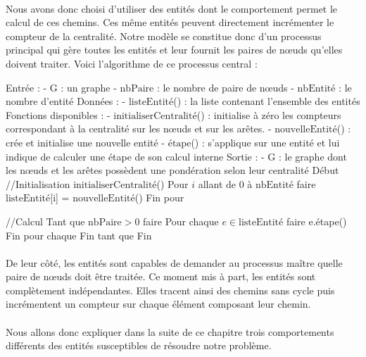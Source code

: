 \documentclass[a4paper, 10pt]{report}
\begin{document}
\paragraph{}Nous avons donc choisi d'utiliser des entités dont le comportement permet le calcul de ces chemins. Ces même entités peuvent directement incrémenter le compteur de la centralité. Notre modèle se constitue donc d'un processus principal qui gère toutes les entités et leur fournit les paires de n\oe uds qu'elles doivent traiter. Voici l'algorithme de ce processus central :

\begin{algo}
Entrée : 
	- $\text{G}$ : un graphe
	- $\text{nbPaire}$ : le nombre de paire de nœuds
	- $\text{nbEntit\'e}$ : le nombre d'entité
Données :
	- $\text{listeEntit\'e}$() : la liste contenant l'ensemble des entités
Fonctions disponibles :
	- $\text{initialiserCentralit\'e}$() : initialise à zéro les compteurs correspondant à la centralité sur les nœuds
	  et sur les arêtes.
	- $\text{nouvelleEntit\'e}$() : crée et initialise une nouvelle entité
	- $\text{\'etape}$() : s'applique sur une entité et lui indique de calculer une étape de son calcul interne
Sortie : 
	- $\text{G}$ : le graphe dont les nœuds et les arêtes possèdent une pondération selon leur centralité
Début
	//Initialisation
	$\text{initialiserCentralit\'e}$()
	Pour $i$ allant de 0 à $\text{nbEntit\'e}$ faire 
		$\text{listeEntit\'e}$[i] = $\text{nouvelleEntit\'e}$()
	Fin pour
	
	//Calcul
	Tant que $\text{nbPaire} > 0$ faire
		Pour chaque $e\in \text{listeEntit\'e}$ faire
			e.étape()
		Fin pour chaque
	Fin tant que
Fin
\end{algo}

\paragraph{}De leur côté, les entités sont capables de demander au processus maître quelle paire de n\oe uds doit être traitée. Ce moment mis à part, les entités sont complètement indépendantes. Elles tracent ainsi des chemins sans cycle puis incrémentent un compteur sur chaque élément composant leur chemin.

\paragraph{}Nous allons donc expliquer dans la suite de ce chapitre trois comportements différents des entités susceptibles de résoudre notre problème. 
\end{document}
